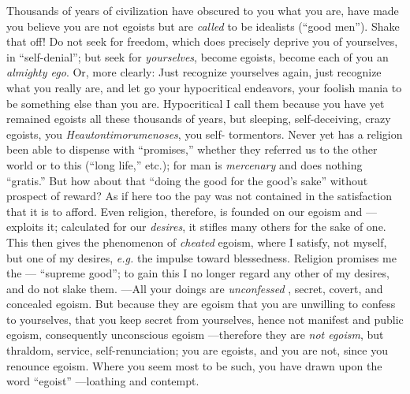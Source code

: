 Thousands of years of civilization have obscured to you what you are, have 
made you believe you are not egoists but are \textit{called} to be idealists 
(``good men''). Shake that off! Do not seek for freedom, which does 
precisely deprive you of yourselves, in ``self-denial''; but seek for 
\textit{yourselves}, become egoists, become each of you an \textit{almighty 
ego}. Or, more clearly: Just recognize yourselves again, just recognize what 
you really are, and let go your hypocritical endeavors, your foolish mania to 
be something else than you are. Hypocritical I call them because you have yet 
remained egoists all these thousands of years, but sleeping, self-deceiving, 
crazy egoists, you \textit{Heautontimorumenoses}, you self- tormentors. Never 
yet has a religion been able to dispense with ``promises,'' whether they 
referred us to the other world or to this (``long life,'' etc.); for man is 
\textit{mercenary} and does nothing ``gratis.'' But how about that ``doing 
the good for the good's sake'' without prospect of reward? As if here too the 
pay was not contained in the satisfaction that it is to afford. Even religion, 
therefore, is founded on our egoism and ---exploits it; calculated for our 
\textit{desires}, it stifles many others for the sake of one. This then gives 
the phenomenon of \textit{cheated} egoism, where I satisfy, not myself, but 
one of my desires, \textit{e.g.} the impulse toward blessedness. Religion 
promises me the --- ``supreme good''; to gain this I no longer regard any 
other of my desires, and do not slake them. ---All your doings are 
\textit{unconfessed} , secret, covert, and concealed egoism. But because they 
are egoism that you are unwilling to confess to yourselves, that you keep 
secret from yourselves, hence not manifest and public egoism, consequently 
unconscious egoism ---therefore they are \textit{not egoism}, but thraldom, 
service, self-renunciation; you are egoists, and you are not, since you 
renounce egoism. Where you seem most to be such, you have drawn upon the word 
``egoist'' ---loathing and contempt.

